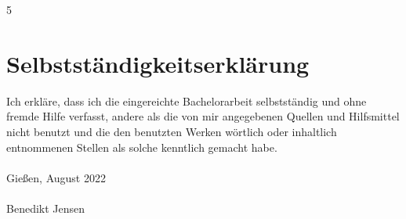 5\chapter{Selbstständigkeitserklärung}
\label{cha:erklaerung}
%
%
Ich erkläre, dass ich die eingereichte Bachelorarbeit selbstständig und ohne fremde Hilfe verfasst, andere als die von mir angegebenen Quellen und Hilfsmittel nicht benutzt und die den benutzten Werken wörtlich oder inhaltlich entnommenen Stellen als solche kenntlich gemacht habe. \\
%
\vspace{.2cm} \\
\noindent Gießen, August 2022 \\
%
\vspace{2cm} \\
\noindent Benedikt Jensen \\
%
%
%
